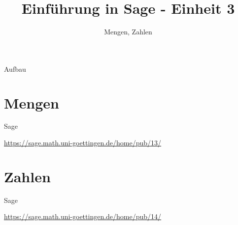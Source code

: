 \documentclass[hyperref={xetex}]{beamer}
\title{Einführung in Sage - Einheit 3}
\subtitle{Mengen, Zahlen}
\begin{document}
\titlepage

\begin{frame}{Aufbau}
\tableofcontents
\end{frame}

\section{Mengen}


\begin{frame}{Sage}
\begin{center}
\url{https://sage.math.uni-goettingen.de/home/pub/13/}
\end{center}
\end{frame}





\section{Zahlen}

\begin{frame}[fragile]{Sage}
\begin{center}
\url{https://sage.math.uni-goettingen.de/home/pub/14/}
\end{center}
\end{frame}


\end{document}
